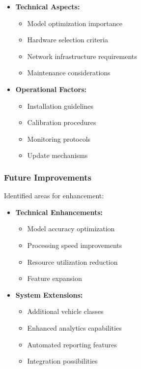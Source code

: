 \begin{itemize}
  \item \textbf{Technical Aspects:}
  \begin{itemize}
    \item Model optimization importance
    \item Hardware selection criteria
    \item Network infrastructure requirements
    \item Maintenance considerations
  \end{itemize}
  
  \item \textbf{Operational Factors:}
  \begin{itemize}
    \item Installation guidelines
    \item Calibration procedures
    \item Monitoring protocols
    \item Update mechanisms
  \end{itemize}
\end{itemize}

\subsubsection{Future Improvements}
Identified areas for enhancement:

\begin{itemize}
  \item \textbf{Technical Enhancements:}
  \begin{itemize}
    \item Model accuracy optimization
    \item Processing speed improvements
    \item Resource utilization reduction
    \item Feature expansion
  \end{itemize}
  
  \item \textbf{System Extensions:}
  \begin{itemize}
    \item Additional vehicle classes
    \item Enhanced analytics capabilities
    \item Automated reporting features
    \item Integration possibilities
  \end{itemize}
\end{itemize}
